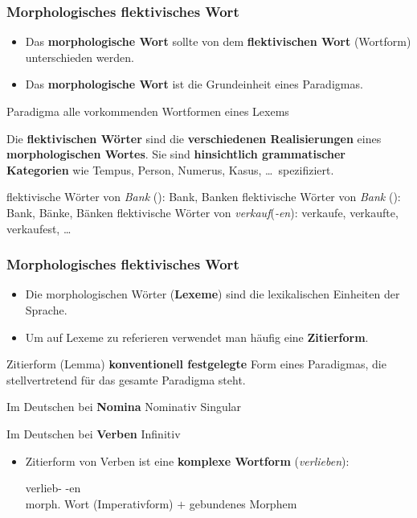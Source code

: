 \begin{frame}
\frametitle{Morphologisches \vs flektivisches Wort}

\begin{itemize}
	\item Das \textbf{morphologische Wort} sollte von dem \textbf{flektivischen Wort} (Wortform) unterschieden werden.
	
	\item Das \textbf{morphologische Wort} ist die Grundeinheit eines Paradigmas.
\end{itemize}

	\begin{block}{Paradigma}
		alle vorkommenden Wortformen eines Lexems
	\end{block}
	
	Die \textbf{flektivischen Wörter} sind die \textbf{verschiedenen Realisierungen} eines \textbf{morphologischen Wortes}. Sie sind \textbf{hinsichtlich grammatischer Kategorien} wie
	Tempus, Person, Numerus, Kasus, \dots\ spezifiziert.
	
	\ea 
	\ea flektivische Wörter von \emph{Bank} (): Bank, Banken
	\ex flektivische Wörter von \emph{Bank} (): Bank, Bänke, Bänken
	\ex flektivische Wörter von \emph{verkauf}(\emph{-en}): verkaufe, verkaufte, verkaufest, \dots
	\z    
	\z

\end{frame}


\begin{frame}
\frametitle{Morphologisches \vs flektivisches Wort}

\begin{itemize}
	\item Die morphologischen Wörter (\textbf{Lexeme}) sind die lexikalischen Einheiten der Sprache.
	
	\item Um auf Lexeme zu referieren verwendet man häufig eine \textbf{Zitierform}.
\end{itemize}
	
	\begin{block}{Zitierform (Lemma)}
		\textbf{konventionell festgelegte} Form eines Paradigmas, die stellvertretend für das gesamte Paradigma steht.
		
		Im Deutschen bei \textbf{Nomina} \ras Nominativ Singular
		
		Im Deutschen bei \textbf{Verben} \ras Infinitiv
		
	\end{block} 

\begin{itemize}
	\item Zitierform von Verben ist eine \textbf{komplexe Wortform} (\zB \emph{verlieben}):
	
	\ea
	\gll verlieb- {} -en\\
	{\footnotesize morph. Wort (Imperativform)} $+$ {\footnotesize gebundenes Morphem}\\
	
	\z 
\end{itemize}
\end{frame}


